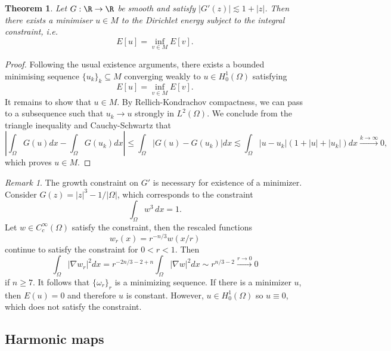 \documentclass[reqno]{amsart}
\newtheorem{theorem}{Theorem}
\theoremstyle{definition}
\theoremstyle{remark}
\newtheorem*{remark}{Remark}
\begin{document}
\begin{theorem}
	Let $G : \R \to \R$ be smooth and satisfy $|G'(z)|\lesssim 1 + |z|$. Then there exists a minimiser $u \in M$ to the Dirichlet energy subject to the integral constraint, i.e.
		\[ E[u] = \inf_{v \in M} E[v]. \] 
\end{theorem}

\begin{proof}
	Following the usual existence arguments, there exists a bounded minimising sequence $\{u_k\}_k \subseteq M$ converging weakly to $u \in H^1_0 (\Omega)$ satisfying 
		\[ E[u] = \inf_{v \in M} E[v]. \]
	It remains to show that $u \in M$. By Rellich-Kondrachov compactness, we can pass to a subsequence such that $u_k \to u$ strongly in $L^2 (\Omega)$. We conclude from the triangle inequality and Cauchy-Schwartz that
		\[ \left|\int_\Omega G(u) dx - \int_\Omega G(u_k) dx \right| \leq \int_\Omega |G(u) - G(u_k)| dx\lesssim \int_\Omega |u - u_k| (1 + |u| + |u_k|)dx \overset{k \to \infty}{\longrightarrow} 0, \]
	which proves $u \in M$. 	 		
\end{proof}

\begin{remark}
	The growth constraint on $G'$ is necessary for existence of a minimizer. Consider $G (z) = |z|^3 - 1/|\Omega|$, which corresponds to the constraint
		\[ \int_\Omega w^3 \, dx = 1. \]
	Let $w \in C_c^\infty (\Omega)$ satisfy the constraint, then the rescaled functions 
		\[ w_r (x) = r^{-n/3} w(x/r) \]
	continue to satisfy the constraint for $0 < r < 1$. Then 
	\[ \int_\Omega |\nabla w_r |^2 dx = r^{-2n/3 - 2 + n} \int_\Omega |\nabla w|^2 dx \sim r^{n/3 - 2} \overset{r \to 0}{\longrightarrow} 0 \]
if $n \geq 7$. It follows that $\{\omega_r\}_r$ is a minimizing sequence. If there is a minimizer $u$, then $E(u) = 0$ and therefore $u$ is constant. However, $u \in H_0^1 (\Omega)$ so $u \equiv 0$, which does not satisfy the constraint.
\end{remark}

\subsection{Harmonic maps}
\end{document}
